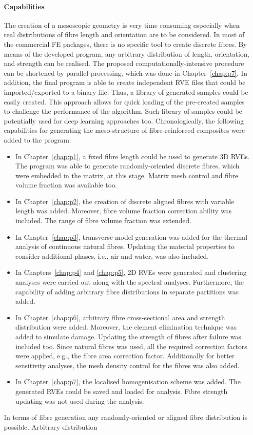 	\paragraph{Capabilities} The creation of a mesoscopic geometry is very time consuming especially when real distributions of fibre length and orientation are to be considered. In most of the commercial FE packages, there is no specific tool to create discrete fibres. By means of the developed program, any arbitrary distribution of length, orientation, and strength can be realised. The proposed computationally-intensive procedure can be shortened by parallel processing, which was done in Chapter~\ref{chap:p7}. In addition, the final program is able to create independent RVE files that could be imported/exported to a binary file. Thus, a library of generated samples could be easily created. This approach allows for quick loading of the pre-created samples to challenge the performance of the algorithm. Such library of samples could be potentially used for deep learning approaches too. Chronologically, the following capabilities for generating the meso-structure of fibre-reinforced composites were added to the program: 
	\begin{itemize}
	\item In Chapter~\ref{chap:p1}, a fixed fibre length could be used to generate 3D RVEs. The program was able to generate randomly-oriented discrete fibres, which were embedded in the matrix, at this stage. Matrix mesh control and fibre volume fraction was available too.
	\item In Chapter~\ref{chap:p2}, the creation of discrete aligned fibres with variable length was added. Moreover, fibre volume fraction correction ability was included. The range of fibre volume fraction was extended.
	\item In Chapter~\ref{chap:p3}, transverse model generation was added for the thermal analysis of continuous natural fibres. Updating the material properties to consider additional phases, i.e., air and water, was also included.
	\item In Chapters~\ref{chap:p4} and \ref{chap:p5}, 2D RVEs were generated and clustering analyses were carried out along with the spectral analyses. Furthermore, the capability of adding arbitrary fibre distributions in separate partitions was added.
		\item In Chapter~\ref{chap:p6}, arbitrary fibre cross-sectional area and strength distribution were added. Moreover, the element elimination technique was added to simulate damage. Updating the strength of fibres after failure was included too. Since natural fibres was used, all the required correction factors were applied, e.g., the fibre area correction factor. Additionally for better sensitivity analyses, the mesh density control for the fibres was also added.
		\item In Chapter~\ref{chap:p7}, the localised homogenisation scheme was added. The generated RVEs could be saved and loaded for analysis. Fibre strength updating was not used during the analysis.
	\end{itemize}
	In terms of fibre generation any randomly-oriented or aligned fibre distribution is possible. Arbitrary distribution 
	

